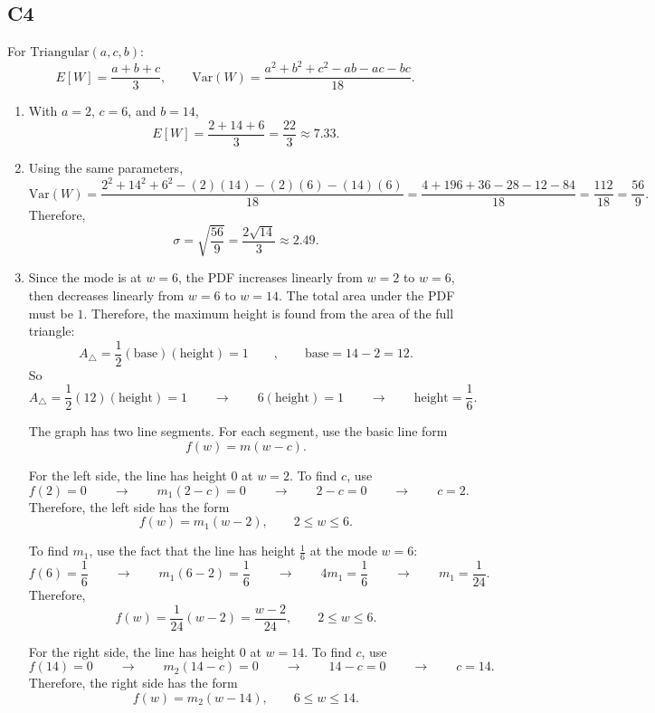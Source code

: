 \subsection*{C4}
For \(\text{Triangular}(a,c,b)\):
\[
E[W]=\frac{a+b+c}{3},\qquad
\mathrm{Var}(W)=\frac{a^2+b^2+c^2-ab-ac-bc}{18}.
\]

\begin{enumerate}[label=\textbf{\alph*)}]
	\item With \(a=2\), \(c=6\), and \(b=14\),
	\[
	E[W]=\frac{2+14+6}{3}=\frac{22}{3}\approx 7.33.
	\]
	
	\item Using the same parameters,
	\[
	\mathrm{Var}(W)=\frac{2^2+14^2+6^2-(2)(14)-(2)(6)-(14)(6)}{18}
	=
	\frac{4+196+36-28-12-84}{18}
	=
	\frac{112}{18}
	=
	\frac{56}{9}.
	\]
	Therefore,
	\[
	\sigma=\sqrt{\frac{56}{9}}=\frac{2\sqrt{14}}{3}\approx 2.49.
	\]
	
	\item Since the mode is at \(w=6\), the PDF increases linearly from \(w=2\) to \(w=6\), then decreases linearly from \(w=6\) to \(w=14\). The total area under the PDF must be \(1\). Therefore, the maximum height is found from the area of the full triangle:
	\[
	A_{\triangle} = \frac{1}{2}(\text{base})(\text{height})=1
	\qquad , \qquad
	\text{base}=14-2=12.
	\]
	So
	\[
	A_{\triangle}=\frac{1}{2}(12)(\text{height})=1
	\qquad \longrightarrow \qquad
	6(\text{height})=1
	\qquad \longrightarrow \qquad
	\text{height}=\frac{1}{6}.
	\]
	
	The graph has two line segments. For each segment, use the basic line form
	\[
	f(w)=m(w-c).
	\]
	
	For the left side, the line has height \(0\) at \(w=2\). To find \(c\), use
	\[
	f(2)=0
	\qquad \longrightarrow \qquad
	m_1(2-c)=0
	\qquad \longrightarrow \qquad
	2-c=0
	\qquad \longrightarrow \qquad
	c=2.
	\]
	Therefore, the left side has the form
	\[
	f(w)=m_1(w-2),
	\qquad 2\le w\le 6.
	\]
	
	To find \(m_1\), use the fact that the line has height \(\frac{1}{6}\) at the mode \(w=6\):
	\[
	f(6)=\frac{1}{6}
	\qquad \longrightarrow \qquad
	m_1(6-2)=\frac{1}{6}
	\qquad \longrightarrow \qquad
	4m_1=\frac{1}{6}
	\qquad \longrightarrow \qquad
	m_1=\frac{1}{24}.
	\]
	Therefore,
	\[
	f(w)=\frac{1}{24}(w-2)
	=
	\frac{w-2}{24},
	\qquad 2\le w\le 6.
	\]
	
	For the right side, the line has height \(0\) at \(w=14\). To find \(c\), use
	\[
	f(14)=0
	\qquad \longrightarrow \qquad
	m_2(14-c)=0
	\qquad \longrightarrow \qquad
	14-c=0
	\qquad \longrightarrow \qquad
	c=14.
	\]
	Therefore, the right side has the form
	\[
	f(w)=m_2(w-14),
	\qquad 6\le w\le 14.
	\]
	

\end{enumerate}
